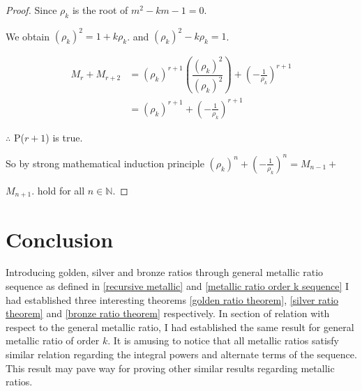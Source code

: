 \documentclass{rmutt-seminar}
\begin{document}
\begin{proof}
\quad \quad \quad Since $\rho_k$ is the root of $m^2 -km -1 =0$. 
 
\quad \quad \quad  We obtain $(\rho_k)^2=1+k\rho_k$. and $(\rho_k)^2-k\rho_k=1$.
 
 \begin{align*}
 M_{r} + M_{r+2} &= (\rho_k)^{r+1}\left(\dfrac{(\rho_k)^2}{(\rho_k)^2}\right)+\left(-\frac{1}{\rho_k}\right)^{r+1}\\
 &= (\rho_k)^{r+1}+\left(-\frac{1}{\rho_k}\right)^{r+1}
 \end{align*}	
 
 \quad \quad \quad $\therefore$ P($r+1$) is true.
 
 \quad \quad \quad So by strong mathematical induction principle $(\rho_k )^n + \left(-\frac{1}{\rho_k }\right)^n = M_{n-1} +$
 
 \quad \quad \quad $ M_{n+1}$. hold for all $n \in \mathbb{N}$.
\end{proof}

\section{Conclusion}

Introducing golden, silver and bronze ratios through general metallic ratio sequence as defined in \eqref{recursive metallic} and \eqref{metallic ratio order k sequence} 
I had established three interesting theorems \ref{golden ratio theorem}, \ref{silver ratio theorem} and \ref{bronze ratio theorem} respectively. In section of relation with respect to the general metallic ratio, I had 
established the same result for general metallic ratio of order $k$. It is amusing to notice that all metallic ratios 
satisfy similar relation regarding the integral powers and alternate terms of the sequence. This result may pave 
way for proving other similar results regarding metallic ratios.


\printbibliography

	
\end{document}
